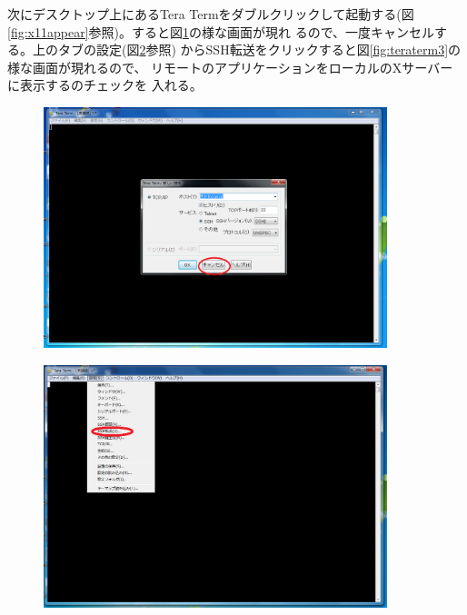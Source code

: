 \documentclass[12pt,a4paper,dvipdfmx]{jarticle}
\begin{document}
次にデスクトップ上にあるTera Termをダブルクリックして起動する(図
\ref{fig:x11appear}参照)。すると図\ref{fig:teraterm1}の様な画面が現れ
るので、一度キャンセルする。上のタブの設定(図\ref{fig:teraterm2}参照)
からSSH転送をクリックすると図\ref{fig:teraterm3}の様な画面が現れるので、
リモートのアプリケーションをローカルのXサーバーに表示するのチェックを
入れる。

\begin{figure}
  \begin{center}
    \includegraphics[clip, width=10.0cm]{./fig/teraterm1_.png}
  \end{center}
  \caption{}
  \label{fig:teraterm1}
\end{figure}

\begin{figure}
  \begin{center}
    \includegraphics[clip, width=10.0cm]{./fig/teraterm2_.png}
  \end{center}
  \caption{}
  \label{fig:teraterm2}
\end{figure}
\end{document}
